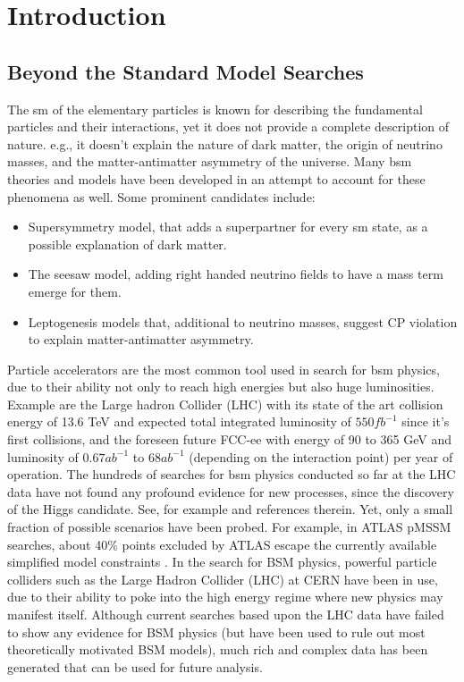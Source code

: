 \documentclass[thesis/Elad_Kliger_Thesis.tex]{subfiles}
\begin{document}
\section{Introduction}

\subsection{Beyond the Standard Model Searches}

The \gls{sm} of the elementary particles \cite{Grossman_StandardModel_2023} is known for describing the fundamental particles and their interactions, yet it does not provide a complete description of nature. e.g., it doesn't explain the nature of dark matter, the origin of neutrino masses, and the matter-antimatter asymmetry of the universe. Many \gls{bsm} theories and models have been developed in an attempt to account for these phenomena as well. Some prominent candidates include:

\begin{itemize}
    \item Supersymmetry model, that adds a superpartner for every \gls{sm} state, as a possible explanation of dark matter.
    \item The seesaw model, adding right handed neutrino fields to have a mass term emerge for them.
    \item Leptogenesis models that, additional to neutrino masses, suggest CP violation to explain matter-antimatter asymmetry.
\end{itemize}

Particle accelerators are the most common tool used in search for \gls{bsm} physics, due to their ability not only to reach high energies but also huge luminosities. Example are the Large hadron Collider (LHC) \cite{CERN_Courier_LHC_Run3} with its state of the art collision energy of 13.6 TeV and expected total integrated luminosity of $550fb^{-1}$ since it's first collisions, and the foreseen future FCC-ee \cite{Benedikt_2026_FCC} with energy of 90 to 365 GeV and luminosity of $0.67ab^{-1}$ to $68ab^{-1}$ (depending on the interaction point) per year of operation. The hundreds of searches for \gls{bsm} physics conducted so far at the LHC data have not found any profound evidence for new processes, since the discovery of the Higgs candidate. See, for example \cite{PDG_2024} and references therein. Yet, only a small fraction of possible scenarios have been probed. For example, in ATLAS pMSSM searches, about 40\% points excluded by ATLAS escape the currently available simplified model constraints \cite{Ambrogi_2018_pMSSM_misses}. In the search for BSM physics, powerful particle colliders such as the Large Hadron Collider (LHC) at CERN have been in use, due to their ability to poke into the high energy regime where new physics may manifest itself. Although current searches based upon the LHC data have failed to show any evidence for BSM physics (but have been used to rule out most theoretically motivated BSM models), much rich and complex data has been generated that can be used for future analysis. 
\end{document}
